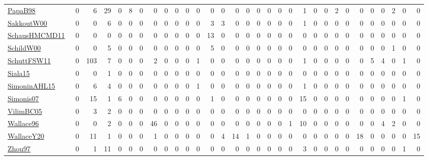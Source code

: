 \documentclass[a4paper]{article}
\begin{document}
{\begin{longtable}{l*{30}{r}}
\href{articles/PapaB98.pdf}{PapaB98}~\cite{PapaB98} & 0 & 6 & 29 & 0 & 8 & 0 & 0 & 0 & 0 & 0 & 0 & 0 & 0 & 0 & 0 & 0 & 0 & 0 & 0 & 1 & 0 & 0 & 2 & 0 & 0 & 0 & 0 & 2 & 0 & 0\\
\href{articles/SakkoutW00.pdf}{SakkoutW00}~\cite{SakkoutW00} & 0 & 0 & 6 & 0 & 0 & 0 & 0 & 0 & 0 & 0 & 0 & 3 & 3 & 0 & 0 & 0 & 0 & 0 & 0 & 1 & 0 & 0 & 0 & 0 & 0 & 0 & 0 & 0 & 0 & 0\\
\href{articles/SchausHMCMD11.pdf}{SchausHMCMD11}~\cite{SchausHMCMD11} & 0 & 0 & 0 & 0 & 0 & 0 & 0 & 0 & 0 & 0 & 0 & 13 & 0 & 0 & 0 & 0 & 0 & 0 & 0 & 0 & 0 & 0 & 0 & 0 & 0 & 0 & 0 & 0 & 0 & 0\\
\href{articles/SchildW00.pdf}{SchildW00}~\cite{SchildW00} & 0 & 0 & 5 & 0 & 0 & 0 & 0 & 0 & 0 & 0 & 0 & 5 & 0 & 0 & 0 & 0 & 0 & 0 & 0 & 0 & 0 & 0 & 0 & 0 & 0 & 0 & 0 & 1 & 0 & 0\\
\href{articles/SchuttFSW11.pdf}{SchuttFSW11}~\cite{SchuttFSW11} & 0 & 103 & 7 & 0 & 0 & 0 & 2 & 0 & 0 & 0 & 1 & 0 & 0 & 0 & 0 & 0 & 0 & 0 & 0 & 1 & 0 & 0 & 0 & 0 & 0 & 5 & 4 & 0 & 1 & 0\\
\href{articles/Siala15.pdf}{Siala15}~\cite{Siala15} & 0 & 0 & 1 & 0 & 0 & 0 & 0 & 0 & 0 & 0 & 0 & 0 & 0 & 0 & 0 & 0 & 0 & 0 & 0 & 0 & 0 & 0 & 0 & 0 & 0 & 0 & 0 & 0 & 0 & 0\\
\href{articles/SimoninAHL15.pdf}{SimoninAHL15}~\cite{SimoninAHL15} & 0 & 6 & 4 & 0 & 0 & 0 & 0 & 0 & 0 & 0 & 1 & 0 & 0 & 0 & 0 & 0 & 0 & 0 & 0 & 1 & 0 & 0 & 0 & 0 & 0 & 0 & 0 & 0 & 0 & 0\\
\href{articles/Simonis07.pdf}{Simonis07}~\cite{Simonis07} & 0 & 15 & 1 & 6 & 0 & 0 & 0 & 0 & 0 & 0 & 0 & 1 & 0 & 0 & 0 & 0 & 0 & 0 & 0 & 15 & 0 & 0 & 0 & 0 & 0 & 0 & 0 & 0 & 1 & 0\\
\href{articles/VilimBC05.pdf}{VilimBC05}~\cite{VilimBC05} & 0 & 3 & 2 & 0 & 0 & 0 & 0 & 0 & 0 & 0 & 0 & 0 & 0 & 0 & 0 & 0 & 0 & 0 & 0 & 0 & 0 & 0 & 0 & 0 & 0 & 0 & 0 & 0 & 0 & 0\\
\href{articles/Wallace96.pdf}{Wallace96}~\cite{Wallace96} & 0 & 0 & 2 & 0 & 0 & 0 & 46 & 0 & 0 & 0 & 0 & 0 & 0 & 0 & 0 & 0 & 0 & 0 & 1 & 10 & 0 & 0 & 0 & 0 & 0 & 0 & 4 & 2 & 0 & 0\\
\href{articles/WallaceY20.pdf}{WallaceY20}~\cite{WallaceY20} & 0 & 11 & 1 & 0 & 0 & 0 & 1 & 0 & 0 & 0 & 0 & 0 & 4 & 14 & 1 & 0 & 0 & 0 & 0 & 0 & 0 & 0 & 0 & 0 & 18 & 0 & 0 & 0 & 0 & 15\\
\href{articles/Zhou97.pdf}{Zhou97}~\cite{Zhou97} & 0 & 1 & 11 & 0 & 0 & 0 & 0 & 0 & 0 & 0 & 0 & 0 & 0 & 0 & 0 & 0 & 0 & 0 & 0 & 3 & 0 & 0 & 0 & 0 & 0 & 0 & 0 & 0 & 1 & 0\\
\end{longtable}
}
\end{document}
